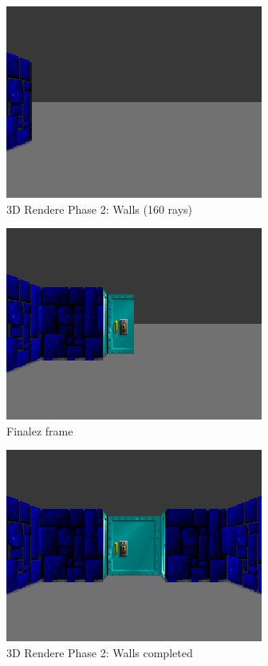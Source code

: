 \documentclass[book.tex]{subfiles}
\begin{document}
     \begin{figure}[H]
\centering
 \includegraphics[scale=1.3]{screenshots/wolf3d_4_partial_wall_32rays.png}
 \caption{3D Rendere Phase 2: Walls (160 rays)} \label{fig:mips}
 \end{figure}
 
 \begin{figure}[H]
\centering
 \includegraphics[scale=1.3]{screenshots/wolf3d_5_partialwalls_160rays.png}
 \caption{Finalez frame} \label{fig:mips}
 \end{figure}
 
 
 \begin{figure}[H]
\centering
 \includegraphics[scale=1.3]{screenshots/wolf4d_2_walls.png}
 \caption{3D Rendere Phase 2: Walls completed} \label{fig:mips}
 \end{figure}
 
\end{document}
